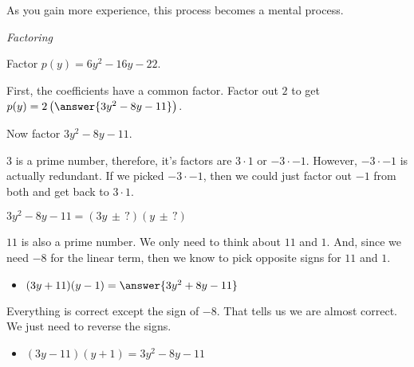 \documentclass{ximera}
\begin{document}
As you gain more experience, this process becomes a mental process.






\begin{example} \textit{Factoring}

Factor $p(y) = 6 y^2 - 16 y - 22$.

\begin{explanation}

First, the coefficients have a common factor.  Factor out $2$ to get $p(y) = 2 \left( \answer{3 y^2 - 8 y - 11} \right)$.


Now factor $3 y^2 - 8 y - 11$.



$3$ is a prime number, therefore, it's factors are $3 \cdot 1$ or $-3 \cdot -1$. However, $-3 \cdot -1$ is actually redundant.  If we picked $-3 \cdot -1$, then we could just factor out $-1$ from both and get back to $3 \cdot 1$.


$3 y^2 - 8 y - 11 = (3y \, \pm \, ?) (y \, \pm \, ?) $


$11$ is also a prime number. We only need to think about $11$ and $1$. And, since we need $-8$ for the linear term, then we know to pick opposite signs for $11$ and $1$.



\begin{itemize}
\item $(3y + 11) (y - 1) = \answer{3 y^2 + 8 y - 11}$
\end{itemize}

Everything is correct except the sign of $-8$. That tells us we are almost correct. We just need to reverse the signs.


\begin{itemize}
\item $(3y - 11) (y + 1) = 3 y^2 - 8 y - 11$
\end{itemize}




\end{explanation}
\end{example}
\end{document}
